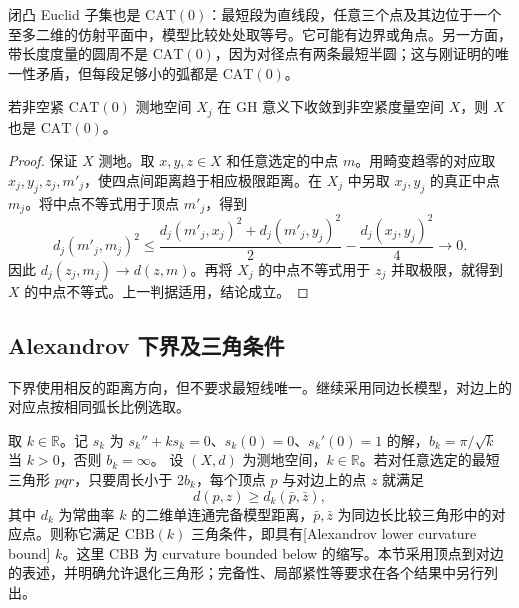 闭凸 Euclid 子集也是 \(\mathrm{CAT}(0)\)：最短段为直线段，任意三个点及其边位于一个至多二维的仿射平面中，模型比较处处取等号。它可能有边界或角点。另一方面，带长度度量的圆周不是 \(\mathrm{CAT}(0)\)，因为对径点有两条最短半圆；这与刚证明的唯一性矛盾，但每段足够小的弧都是 \(\mathrm{CAT}(0)\)。

\begin{proposition}\label{g3:prop:compact-cat-zero-limit}
	若非空紧 \(\mathrm{CAT}(0)\) 测地空间 \(X_j\) 在 GH 意义下收敛到非空紧度量空间 \(X\)，则 \(X\) 也是 \(\mathrm{CAT}(0)\)。
\end{proposition}
\begin{proof}
	保证 \(X\) 测地。取 \(x,y,z\in X\) 和任意选定的中点 \(m\)。用畸变趋零的对应取 \(x_j,y_j,z_j,m'_j\)，使四点间距离趋于相应极限距离。在 \(X_j\) 中另取 \(x_j,y_j\) 的真正中点 \(m_j\)。将中点不等式用于顶点 \(m'_j\)，得到
	\[
		d_j(m'_j,m_j)^2\le\frac{d_j(m'_j,x_j)^2+d_j(m'_j,y_j)^2}{2}
		-\frac{d_j(x_j,y_j)^2}{4}\longrightarrow0.
	\]
	因此 \(d_j(z_j,m_j)\to d(z,m)\)。再将 \(X_j\) 的中点不等式用于 \(z_j\) 并取极限，就得到 \(X\) 的中点不等式。上一判据适用，结论成立。
\end{proof}

\subsection{Alexandrov 下界及三角条件}
\label{g3:subsec:1005:02}
下界使用相反的距离方向，但不要求最短线唯一。继续采用同边长模型，对边上的对应点按相同弧长比例选取。

\begin{definition}\label{g3:def:cbb-triangle-condition}
	取 \(k\in\mathbb R\)。记 \(s_k\) 为 \(s_k''+ks_k=0\)、\(s_k(0)=0\)、\(s_k'(0)=1\) 的解，\(b_k=\pi/\sqrt k\) 当 \(k>0\)，否则 \(b_k=\infty\)。
	设 \((X,d)\) 为测地空间，\(k\in\mathbb R\)。若对任意选定的最短三角形 \(pqr\)，只要周长小于 \(2b_k\)，每个顶点 \(p\) 与对边上的点 \(z\) 就满足
	\begin{equation}\label{g3:eq:cbb-triangle-condition}
		d(p,z)\ge d_k(\bar p,\bar z),
	\end{equation}
	其中 \(d_k\) 为常曲率 \(k\) 的二维单连通完备模型距离，\(\bar p,\bar z\) 为同边长比较三角形中的对应点。则称它满足 \(\mathrm{CBB}(k)\) 三角条件，即具有[Alexandrov lower curvature bound] \(k\)。这里 CBB 为 curvature bounded below 的缩写。本节采用顶点到对边的表述，并明确允许退化三角形；完备性、局部紧性等要求在各个结果中另行列出。
\end{definition}

